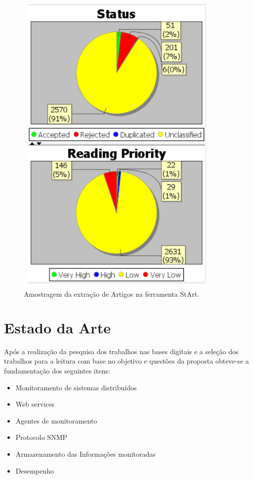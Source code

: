 \begin{figure}[!ht]
\centering
\includegraphics[width = 10cm, height=15cm]{img/extra__oRSLStArt.png}
\caption{Amostragem da extração de Artigos na ferramenta StArt\textsuperscript{\textregistered}.}
\label{fig:StArt}
\end{figure}



\section{Estado da Arte}
Após a realização da pesquisa dos trabalhos nas bases digitais e a seleção dos trabalhos para a leitura com base no objetivo e questões da proposta obteve-se a fundamentação dos seguintes itens:
\begin{itemize}
\item Monitoramento de sistemas distribuídos
\item Web services
\item Agentes de monitoramento
\item Protocolo SNMP
\item Armazenamento das Informações monitoradas
\item Desempenho
\end{itemize}

